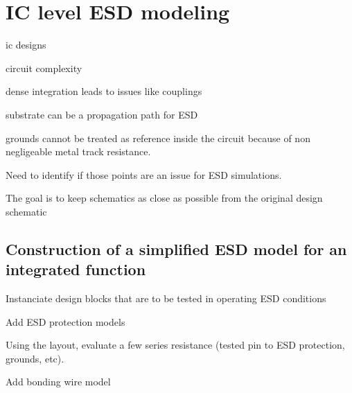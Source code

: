 \section{IC level ESD modeling}

\gls{ic} designs

circuit complexity

dense integration leads to issues like couplings

substrate can be a propagation path for ESD

grounds cannot be treated as reference inside the circuit because of non negligeable metal track resistance.

Need to identify if those points are an issue for ESD simulations.

The goal is to keep schematics as close as possible from the original design schematic

\subsection{Construction of a simplified ESD model for an integrated function}

Instanciate design blocks that are to be tested in operating ESD conditions

Add ESD protection models

Using the layout, evaluate a few series resistance (tested pin to ESD protection, grounds, etc).

Add bonding wire model
